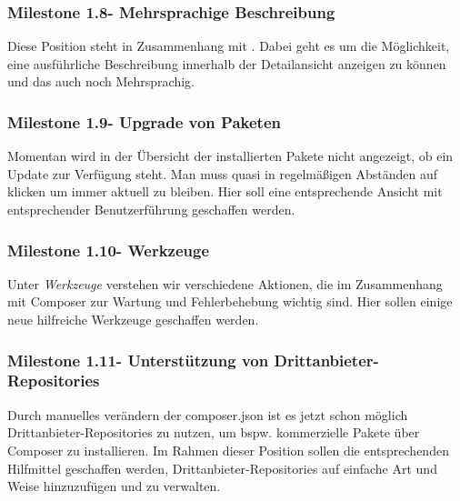 \documentclass[
paper=a4,
draft=false,%
fontsize=10pt%
]{scrartcl}
\begin{document}
\pagebreak

\subsubsection[Milestone 1.8 - Mehrsprachige Beschreibung]{Milestone 1.8\footnotemark - Mehrsprachige Beschreibung}
\label{subsec:ccc-milestone-1.8}

Diese Position steht in Zusammenhang mit . Dabei geht es um die Möglichkeit, eine ausführliche Beschreibung innerhalb der Detailansicht anzeigen zu können und das auch noch Mehrsprachig.

\subsubsection[Milestone 1.9 - Upgrade von Paketen]{Milestone 1.9\footnotemark - Upgrade von Paketen}
\label{subsec:ccc-milestone-1.9}

Momentan wird in der Übersicht der installierten Pakete nicht angezeigt, ob ein Update zur Verfügung steht. Man muss quasi in regelmäßigen Abständen auf  klicken um immer aktuell zu bleiben. Hier soll eine entsprechende Ansicht mit entsprechender Benutzerführung geschaffen werden.

\subsubsection[Milestone 1.10 - Werkzeuge]{Milestone 1.10\footnotemark - Werkzeuge}
\label{subsec:ccc-milestone-1.10}

Unter \emph{Werkzeuge} verstehen wir verschiedene Aktionen, die im Zusammenhang mit Composer zur Wartung und Fehlerbehebung wichtig sind. Hier sollen einige neue hilfreiche Werkzeuge geschaffen werden.

\subsubsection[Milestone 1.11 - Unterstützung von Drittanbieter-Repositories]{Milestone 1.11\footnotemark - Unterstützung von Drittanbieter-Repositories}
\label{subsec:ccc-milestone-1.11}

Durch manuelles verändern der composer.json ist es jetzt schon möglich Drittanbieter-Repositories zu nutzen, um bspw. kommerzielle Pakete über Composer zu installieren. Im Rahmen dieser Position sollen die entsprechenden Hilfmittel geschaffen werden, Drittanbieter-Repositories auf einfache Art und Weise hinzuzufügen und zu verwalten.
\end{document}
